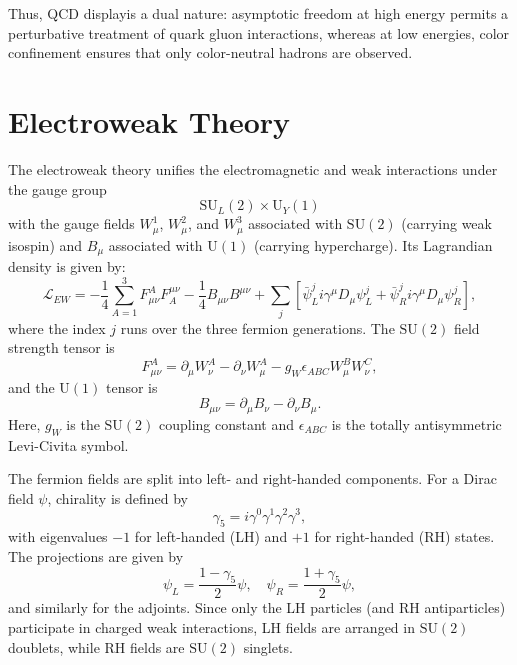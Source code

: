 Thus, QCD displayis a dual nature: asymptotic freedom at high energy permits a perturbative treatment of quark gluon interactions, whereas at low energies, color confinement ensures that only color-neutral hadrons are observed.

\section{Electroweak Theory}
\label{ew_theory}

The electroweak theory unifies the electromagnetic and weak interactions under the gauge group
\begin{equation}
\mathrm{SU}_L(2) \times \mathrm{U}_Y(1)
\end{equation}
with the gauge fields $W_\mu^1$, $W_\mu^2$, and $W_\mu^3$ associated with $\mathrm{SU}(2)$ (carrying weak isospin) and $B_\mu$ associated with $\mathrm{U}(1)$ (carrying hypercharge). Its Lagrandian density is given by:
\begin{equation}
\mathcal{L}_{EW}=-\frac{1}{4}\sum_{A=1}^3 F_{\mu\nu}^A F_A^{\mu\nu}-\frac{1}{4}B_{\mu\nu}B^{\mu\nu}+\sum_j \left[ \bar{\psi}_L^j i \gamma^\mu D_\mu \psi_L^j + \bar{\psi}_R^j i \gamma^\mu D_\mu \psi_R^j \right],
\end{equation}
where the index $j$ runs over the three fermion generations. The $\mathrm{SU}(2)$ field strength tensor is
\begin{equation}
F_{\mu\nu}^A=\partial_\mu W^A_\nu-\partial_\nu W_\mu^A-g_W \epsilon_{ABC} W_\mu^B W_\nu^C,
\end{equation}
and the $\mathrm{U}(1)$ tensor is
\begin{equation}
B_{\mu\nu}=\partial_\mu B_\nu - \partial_\nu B_\mu.
\end{equation}
Here, $g_W$ is the $\mathrm{SU}(2)$ coupling constant and $\epsilon_{ABC}$ is the totally antisymmetric Levi-Civita symbol.

The fermion fields are split into left- and right-handed components. For a Dirac field $\psi$, chirality is defined by
\begin{equation}
\gamma_5= i \gamma^0\gamma^1\gamma^2\gamma^3,
\end{equation}
with eigenvalues $-1$ for left-handed (LH) and $+1$ for right-handed (RH) states. The projections are given by
\begin{equation}
\psi_L=\frac{1-\gamma_5}{2}\psi, \quad \psi_R=\frac{1+\gamma_5}{2}\psi,
\end{equation}
and similarly for the adjoints. Since only the LH particles (and RH antiparticles) participate in charged weak interactions, LH fields are arranged in $\mathrm{SU}(2)$ doublets, while RH fields are $\mathrm{SU}(2)$ singlets.

